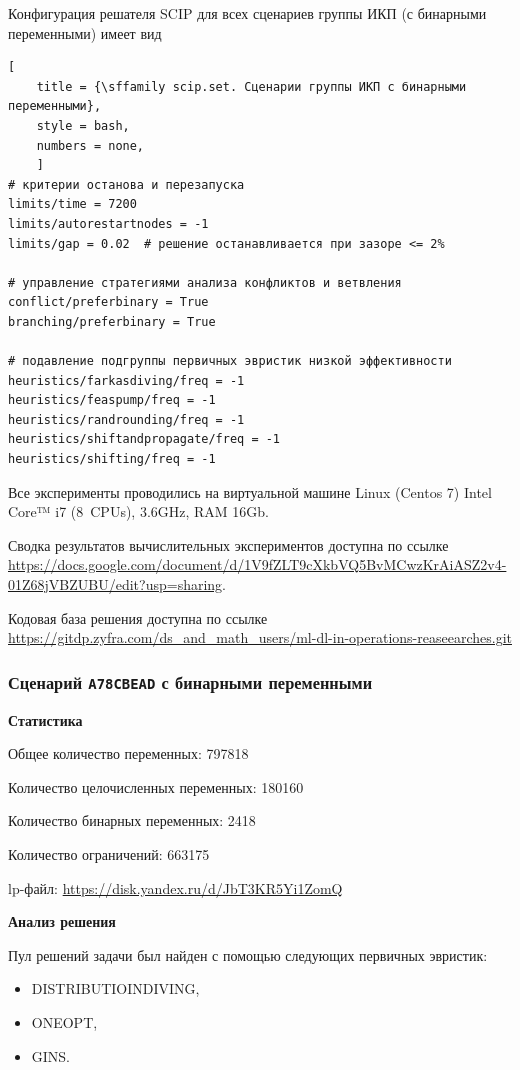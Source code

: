 \documentclass[%
	11pt,
	a4paper,
	utf8,
		]{article}
\begin{document}
Конфигурация решателя SCIP для всех сценариев группы ИКП (с бинарными переменными) имеет вид
\begin{lstlisting}[
	title = {\sffamily scip.set. Сценарии группы ИКП с бинарными переменными},
	style = bash,
	numbers = none,
	]
# критерии останова и перезапуска
limits/time = 7200
limits/autorestartnodes = -1
limits/gap = 0.02  # решение останавливается при зазоре <= 2%

# управление стратегиями анализа конфликтов и ветвления
conflict/preferbinary = True
branching/preferbinary = True

# подавление подгруппы первичных эвристик низкой эффективности
heuristics/farkasdiving/freq = -1
heuristics/feaspump/freq = -1
heuristics/randrounding/freq = -1
heuristics/shiftandpropagate/freq = -1
heuristics/shifting/freq = -1
\end{lstlisting}

Все эксперименты проводились на виртуальной машине Linux (Centos 7) Intel Core™ i7 (8~CPUs), 3.6GHz, RAM 16Gb.

Сводка результатов вычислительных экспериментов доступна по ссылке \url{https://docs.google.com/document/d/1V9fZLT9cXkbVQ5BvMCwzKrAiASZ2v4-01Z68jVBZUBU/edit?usp=sharing}.

Кодовая база решения доступна по ссылке \url{https://gitdp.zyfra.com/ds_and_math_users/ml-dl-in-operations-reaseearches.git}

\subsubsection{Сценарий \texttt{A78CBEAD} с бинарными переменными}

\textbf{Статистика}\vspace*{1mm}

Общее количество переменных: 797818

Количество целочисленных переменных: 180160

Количество бинарных переменных: 2418

Количество ограничений: 663175

lp-файл: \url{https://disk.yandex.ru/d/JbT3KR5Yi1ZomQ}

\vspace*{5mm}\textbf{Анализ решения}\vspace*{1mm}

Пул решений задачи был найден с помощью следующих первичных эвристик:
\begin{itemize}
	\item DISTRIBUTIOINDIVING,
	
	\item ONEOPT,
	
	\item GINS.
\end{itemize}
\end{document}
